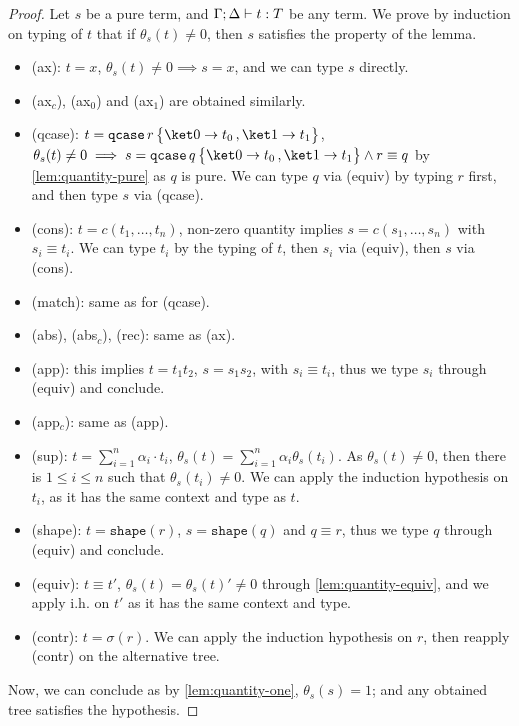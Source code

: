 \documentclass[10pt,a4paper]{article}
\newcommand{\textqcase}{\ensuremath{\mathtt{qcase}}}
\newcommand{\zket}{\ket 0}
\newcommand{\oket}{\ket 1}
\newcommand{\qcasebase}[2]{
  \textqcase\,#1\left\{\! \begin{aligned} #2 \end{aligned}\right\}
}
\newcommand{\qcase}[3]{
  \qcasebase {#1} {\zket \to #2\,, \oket \to #3}
}
\newcommand{\shape}[1]{\mathtt{shape}(#1)}
\newcommand{\typing}[4]{
  \ifx&#1&\varnothing \else #1\fi; 
  \ifx&#2&\varnothing \else #2\fi 
  \vdash {#3} : #4
}
\newcommand{\qt}[2]{\theta_{#1}(#2)}
\begin{document}
\begin{proof}
  Let $s$ be a pure term, and $\typing \Gamma \Delta t T$ be any term.
  We prove by induction on typing of $t$ that if $\qt s t \neq 0$,
  then $s$ satisfies the property of the lemma.
  \begin{itemize}
    \item (ax): $t = x$, $\qt s t \neq 0 \implies s = x$, and we can
      type $s$ directly.
    \item (ax$_c$), (ax$_0$) and (ax$_1$) are obtained similarly.
    \item (qcase): $t = \qcase r {t_0} {t_1}$, $\qt s t \neq 0
      \implies s = \qcase q {t_0} {t_1} \wedge r \equiv q$ by
      \autoref{lem:quantity-pure} as $q$ is pure.
      We can type $q$ via (equiv) by typing $r$ first, and then type
      $s$ via (qcase).
    \item (cons): $t = c(t_1, \dots, t_n)$, non-zero quantity implies
      $s = c(s_1, \dots, s_n)$ with $s_i \equiv t_i$.
      We can type $t_i$ by the typing of $t$, then $s_i$ via (equiv),
      then $s$ via (cons).
    \item (match): same as for (qcase).
    \item (abs), (abs$_c$), (rec): same as (ax).
    \item (app): this implies $t = t_1 t_2$, $s = s_1s_2$, with $s_i
      \equiv t_i$, thus we type $s_i$ through (equiv) and conclude.
    \item (app$_c$): same as (app).
    \item (sup): $t = \sum_{i=1}^n \alpha_i \cdot t_i$, $\qt s t =
      \sum_{i=1}^n \alpha_i \qt s {t_i}$.
      As $\qt s t \neq 0$, then there is $1 \leq i \leq n$ such that
      $\qt s {t_i} \neq 0$.
      We can apply the induction hypothesis on $t_i$, as it has the
      same context and type as $t$.
    \item (shape): $t = \shape r$, $s = \shape q$ and $q \equiv r$,
      thus we type $q$ through (equiv) and conclude.
    \item (equiv): $t \equiv t'$, $\qt s t = \qt s t' \neq 0$ through
      \autoref{lem:quantity-equiv}, and we apply i.h. on $t'$ as it
      has the same context and type.
    \item (contr): $t = \sigma(r)$. We can apply the induction
      hypothesis on $r$, then reapply (contr) on the alternative tree.
  \end{itemize}

  Now, we can conclude as by \autoref{lem:quantity-one}, $\qt s s =
  1$; and any obtained tree satisfies the hypothesis. \qedhere
\end{proof}
\end{document}
